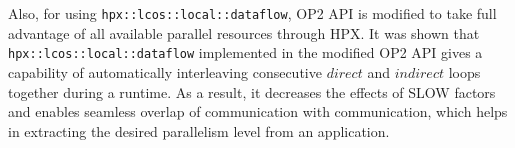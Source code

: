 \documentclass[conference]{IEEEtran}
\begin{document}
Also, for using \texttt{hpx::lcos::local::dataflow}, OP2 API is modified to take full advantage of all available parallel resources through HPX. It was shown that \texttt{hpx::lcos::local::dataflow} implemented in the modified OP2 API gives a capability of automatically interleaving consecutive $direct$ and $indirect$ loops together during a runtime. As a result, it decreases the effects of SLOW factors and enables seamless overlap of communication with communication, which helps in extracting the desired parallelism level from an application. \\





 




\end{document}
